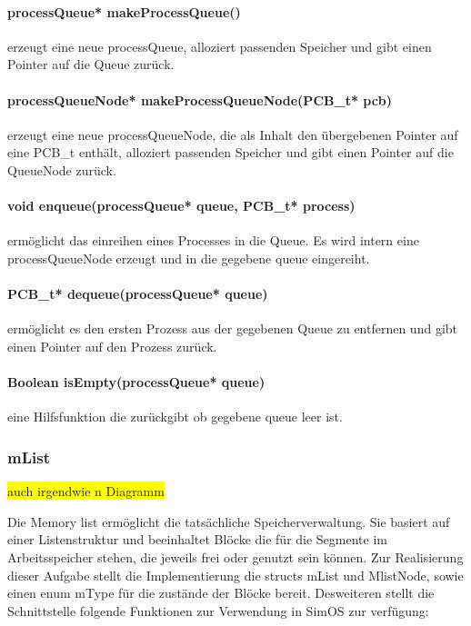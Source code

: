 \paragraph{processQueue* makeProcessQueue()} erzeugt eine neue processQueue, alloziert passenden Speicher und gibt einen Pointer auf die Queue zurück.

\paragraph{processQueueNode* makeProcessQueueNode(PCB\_t* pcb)} erzeugt eine neue processQueueNode, die als Inhalt den übergebenen Pointer auf eine PCB\_t enthält, alloziert passenden Speicher und gibt einen Pointer auf die QueueNode zurück.

\paragraph{void enqueue(processQueue* queue, PCB\_t* process)} ermöglicht das einreihen eines Processes in die Queue. Es wird intern eine processQueueNode erzeugt und in die gegebene queue eingereiht.

\paragraph{PCB\_t* dequeue(processQueue* queue)} ermöglicht es den ersten Prozess aus der gegebenen Queue zu entfernen und gibt einen Pointer auf den Prozess zurück.

\paragraph{Boolean isEmpty(processQueue* queue)} eine Hilfsfunktion die zurückgibt ob gegebene queue leer ist.


\subsubsection{mList}
\colorbox{yellow}{auch irgendwie n Diagramm}

Die Memory list ermöglicht die tatsächliche Speicherverwaltung. Sie basiert auf einer Listenstruktur und beeinhaltet Blöcke die für die Segmente im Arbeitsspeicher stehen, die jeweils frei oder genutzt sein können. 
Zur Realisierung dieser Aufgabe stellt die Implementierung die structs mList und MlistNode, sowie einen enum mType für die zustände der Blöcke bereit.
Desweiteren stellt die Schnittstelle folgende Funktionen zur Verwendung in SimOS zur verfügung:


